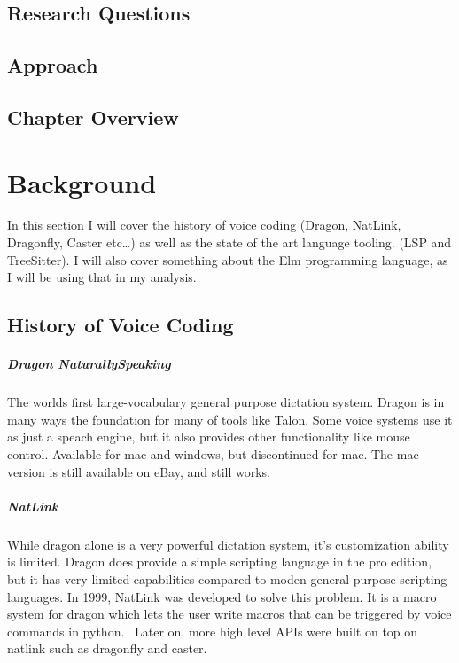 \documentclass[a4paper,english]{ifimaster}
\begin{document}
\section{Research Questions}
\section{Approach}
\section{Chapter Overview}

\chapter{Background}
In this section I will cover the history of voice coding (Dragon, NatLink, Dragonfly, Caster etc\ldots)
as well as the state of the art language tooling. (LSP and TreeSitter).
I will also cover something about the Elm programming language, as I will be using that in my analysis.


\section{History of Voice Coding}

\paragraph{Dragon NaturallySpeaking}
The worlds first large-vocabulary general purpose dictation system.
Dragon is in many ways the foundation for many of tools like Talon.
Some voice systems use it as just a speach engine, but it also provides other functionality like mouse control.
Available for mac and windows, but discontinued for mac.%
The mac version is still available on eBay, and still works. %

\paragraph{NatLink}
While dragon alone is a very powerful dictation system, it's customization ability is limited.
Dragon does provide a simple scripting language in the pro edition, but it has very limited capabilities compared to
moden general purpose scripting languages.
In 1999, NatLink was developed to solve this problem. It is a macro system for dragon which lets the user write macros that can be triggered by voice commands
in python.~\parencite{gould2001implementation}
Later on, more high level APIs were built on top on natlink such as dragonfly and caster. %
\end{document}
